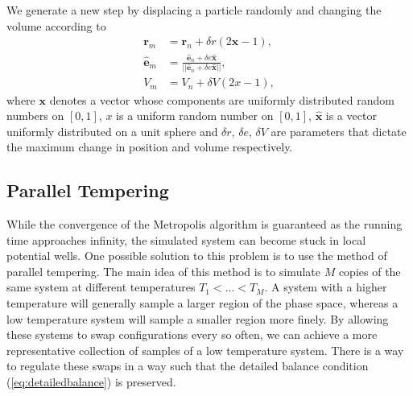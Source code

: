 We generate a new step by displacing a particle randomly and changing the volume according to
\begin{align}
    \mathbf{r}_m &= \mathbf{r}_n+ \delta r (2\mathbf{x}-1),\\
    \hat{\mathbf{e}}_m &= \frac{\hat{\mathbf{e}}_n+ \delta e\hat{\mathbf{x}}}{||\hat{\mathbf{e}}_n+ \delta e\hat{\mathbf{x}}||} ,\\
    V_m &= V_n + \delta V (2x-1),
\end{align}
where $\mathbf{x}$ denotes a vector whose components are uniformly distributed random numbers on $[0,1]$, $x$ is a uniform random number on $[0,1]$, $\hat{\mathbf{x}}$ is a vector uniformly distributed on a unit sphere and $\delta r,\,\delta e ,\, \delta V$ are parameters that dictate the maximum change in position and volume respectively.


\subsection{Parallel Tempering}
\label{subsubsec:paralleltemp}
While the convergence of the Metropolis algorithm is guaranteed as the running time approaches infinity, the simulated system can become stuck in local potential wells. One possible solution to this problem is to use the method of parallel tempering. The main idea of this method is to simulate $M$ copies of the same system at different temperatures $T_1 < ... < T_M$. A system with a higher temperature will generally sample a larger region of the phase space, whereas a low temperature system will sample a smaller region more finely. By allowing these systems to swap configurations every so often, we can achieve a more representative collection of samples of a low temperature system. There is a way to regulate these swaps in a way such that the detailed balance condition (\ref{eq:detailedbalance}) is preserved.

